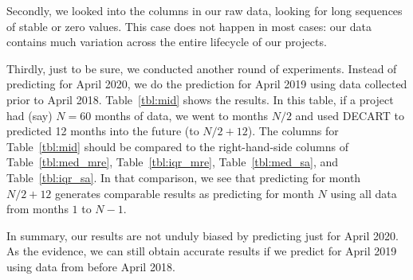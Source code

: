 \documentclass[sigconf,anonymous,review]{acmart}
\begin{document}
Secondly, we looked into the columns in our raw data, looking for long sequences of stable or zero values. This case does not happen in most cases: our data contains much variation across the entire lifecycle of our projects.

Thirdly, just to be sure, we conducted another round of experiments. Instead of predicting for April 2020, we do the prediction for April 2019 using
data collected prior to April 2018.
 Table~\ref{tbl:mid} shows the results. In this table, if a project had (say) $N=60$ months of data, we went to months $N/2$ and used DECART to predicted 12 months into the future (to $N/2+12$). The columns for Table~\ref{tbl:mid}  should be compared to the right-hand-side columns of Table~\ref{tbl:med_mre}, Table~\ref{tbl:iqr_mre},  Table~\ref{tbl:med_sa}, and Table~\ref{tbl:iqr_sa}. In that comparison, we see that predicting for month $N/2+12$ generates comparable results as predicting for  month $N$ using all data from months  $1$ to $N-1$. 
 
 In summary,
our results are not unduly biased by predicting just for April 2020. As the evidence, we can still obtain accurate results if we predict for April 2019 using data from before April 2018.
\end{document}
